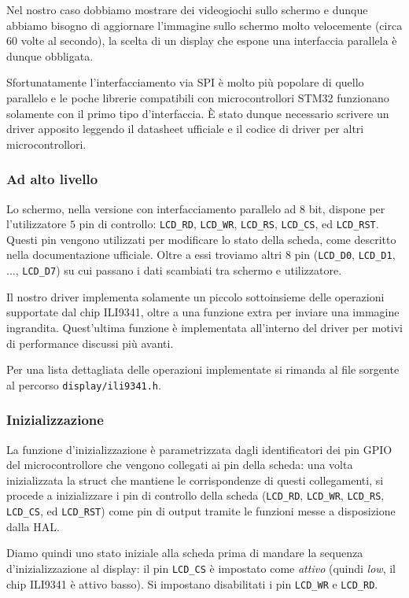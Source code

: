 \documentclass[hidelinks,12pt]{article}
\begin{document}
Nel nostro caso dobbiamo mostrare dei videogiochi sullo schermo e dunque
abbiamo bisogno di aggiornare l'immagine sullo schermo molto velocemente
(circa 60 volte al secondo), la scelta di un display che espone una
interfaccia parallela è dunque obbligata.

Sfortunatamente l'interfacciamento via SPI è molto più popolare di quello
parallelo e le poche librerie compatibili con microcontrollori STM32 funzionano
solamente con il primo tipo d'interfaccia.
È stato dunque necessario scrivere un driver apposito leggendo il datasheet
ufficiale\cite{ili9341} e il codice di driver per altri microcontrollori.

\subsubsection{Ad alto livello}
Lo schermo, nella versione con interfacciamento parallelo ad 8 bit, dispone
per l'utilizzatore $5$ pin di controllo: \texttt{LCD\_RD}, \texttt{LCD\_WR},
\texttt{LCD\_RS}, \texttt{LCD\_CS}, ed \texttt{LCD\_RST}.
Questi pin vengono utilizzati per modificare lo stato della scheda, come
descritto nella documentazione ufficiale.
Oltre a essi troviamo altri $8$ pin (\texttt{LCD\_D0}, \texttt{LCD\_D1}, ...,
\texttt{LCD\_D7}) su cui passano i dati scambiati tra schermo e utilizzatore.

Il nostro driver implementa solamente un piccolo sottoinsieme delle operazioni
supportate dal chip ILI9341, oltre a una funzione extra per inviare
una immagine ingrandita.
Quest'ultima funzione è implementata all'interno del driver per motivi di
performance discussi più avanti.

Per una lista dettagliata delle operazioni implementate si rimanda al file
sorgente al percorso
\texttt{display/ili9341.h}.

\subsubsection{Inizializzazione}
La funzione d'inizializzazione è parametrizzata dagli identificatori dei pin
GPIO del microcontrollore che vengono collegati ai pin della scheda: una volta
inizializzata la struct che mantiene le corrispondenze di questi collegamenti,
si procede a inizializzare i pin di controllo della scheda (\texttt{LCD\_RD},
\texttt{LCD\_WR}, \texttt{LCD\_RS}, \texttt{LCD\_CS}, ed \texttt{LCD\_RST}) come
pin di output tramite le funzioni messe a disposizione dalla HAL.

Diamo quindi uno stato iniziale alla scheda prima di mandare la sequenza
d'inizializzazione al display:
il pin \texttt{LCD\_CS} è impostato come \textit{attivo} (quindi \textit{low},
il chip ILI9341 è attivo basso).
Si impostano disabilitati i pin \texttt{LCD\_WR} e \texttt{LCD\_RD}.
\end{document}

